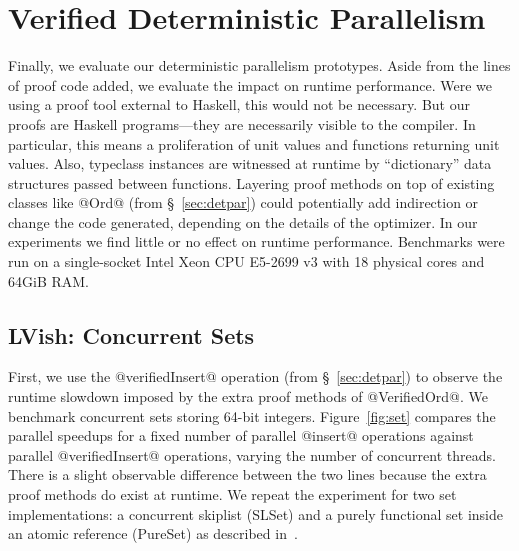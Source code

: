 \section{Verified Deterministic Parallelism}\label{sec:eval-parallelism}


Finally, we evaluate our deterministic
parallelism prototypes.  Aside from the lines of proof code added,
we evaluate the impact on runtime performance.
%
Were we using a proof tool external to Haskell, this would not be necessary.
But our proofs are Haskell programs---they are necessarily visible to the
compiler.  In particular, this means a proliferation of unit values and functions
returning unit values.  Also, typeclass instances are witnessed at runtime by
``dictionary'' data structures passed between functions.  Layering proof methods
on top of existing classes like @Ord@ (from \S~\ref{sec:detpar})
could potentially add indirection or change the
code generated, depending on the details of the optimizer.
%
%
In our experiments we find little or no effect on runtime performance.
Benchmarks were run on a single-socket Intel{\textregistered}
Xeon{\textregistered} CPU E5-2699 v3 with 18 physical cores and 64GiB RAM.

\subsection{LVish: Concurrent Sets}
\label{sec:set}

First, we use the @verifiedInsert@ operation (from \S~\ref{sec:detpar})
to observe the runtime slowdown imposed by the extra proof methods
of @VerifiedOrd@.
We benchmark concurrent sets storing 64-bit integers.
Figure~\ref{fig:set} compares the parallel speedups
for a fixed number of parallel @insert@ operations
against parallel @verifiedInsert@ operations, varying the number of concurrent
threads.
%
There is a slight observable difference between the two
lines because the extra proof methods do exist at runtime.
%
We repeat the experiment for two set implementations: a concurrent skiplist
(SLSet) and a purely functional set inside an atomic reference (PureSet)
as described in~\citet{kuper2014freeze}.

